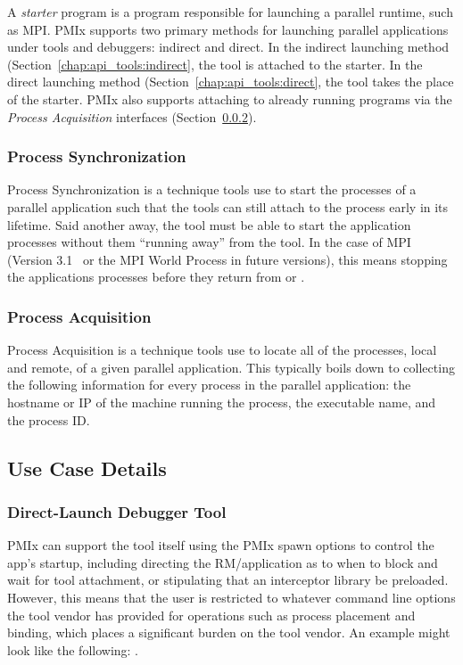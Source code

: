 A \textit{starter} program is a program responsible for launching a parallel runtime, such as \ac{MPI}. \ac{PMIx} supports two primary methods for launching parallel applications under tools and debuggers: indirect and direct. In the indirect launching method (Section~\ref{chap:api_tools:indirect}, the tool is attached to the starter. In the direct launching method (Section~\ref{chap:api_tools:direct}, the tool takes the place of the starter.
\ac{PMIx} also supports attaching to already running programs via the \textit{Process Acquisition} interfaces (Section~\ref{subsubsec:process-acq}).

\subsubsection{Process Synchronization}

Process Synchronization is a technique tools use to start the processes of a parallel application such that the tools can still attach to the process early in its lifetime.  Said another away, the tool must be able to start the application processes without them ``running away'' from the tool.  In the case of \ac{MPI} (Version 3.1~\cite{mpi-3.1} or the MPI World Process in future versions), this means stopping the applications processes before they return from  or .

\subsubsection{Process Acquisition}\label{subsubsec:process-acq}

Process Acquisition is a technique tools use to locate all of the processes, local and remote, of a given parallel application.  This typically boils down to collecting the following information for every process in the parallel application: the hostname or IP of the machine running the process, the executable name, and the process ID.

\subsection{Use Case Details}
\subsubsection{Direct-Launch Debugger Tool}

PMIx can support the tool itself using the PMIx spawn options to control the app’s startup, including directing the RM/application as to when to block and wait for tool attachment, or stipulating that an interceptor library be preloaded. However, this means that the user is restricted to whatever command line options the tool vendor has provided for operations such as process placement and binding, which places a significant burden on the tool vendor. An example might look like the following: .

